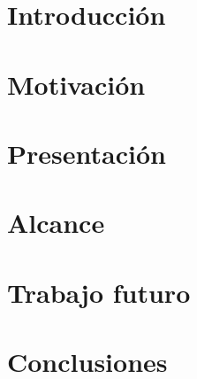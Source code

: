 \documentclass[12pt, a4paper, twoside]{article}
\begin{document}
{}



\clearpage{\pagestyle{empty}\clearpage}
\setcounter{page}{1}


\begin{TP}




\section{Introducción}

\section{Motivación}

\section{Presentación}

\section{Alcance}

\section{Trabajo futuro}

\section{Conclusiones}


\printbibliography


\end{TP}
\end{document}
